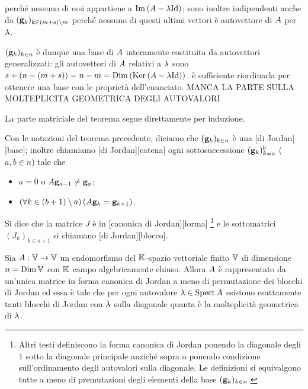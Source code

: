 perch\'e nessuno di essi appartiene a 
$\Image{(\LinearTransformation - \Eigenvalue\Identity)}$;
sono inoltre indipendenti anche da
$(\GeneralizedEigenvector_k)_{k \in (m + s) \SetMin m}$
perch\'e nessuno di questi ultimi vettori \`e autovettore di
$A$ per $\lambda$.
\par $(\GeneralizedEigenvector_k)_{k \in n}$ \`e dunque una base di
$A$ interamente costituita da autovettori generalizzati:
gli autovettori di $A$ relativi a $\lambda$ sono
$s + (n - (m + s)) = n - m =
\LinearDimension{(\Kernel{(\LinearTransformation - \Eigenvalue\Identity)})}$.
\`e sufficiente riordinarla per ottenere una base con le propriet\`a
dell'enunciato.
MANCA LA PARTE SULLA MOLTEPLICITA GEOMETRICA DEGLI AUTOVALORI
\par La parte matriciale del teorema segue direttamente per induzione.
\begin{Definition}
  Con le notazioni del teorema precedente, diciamo che
  $(\GeneralizedEigenvector_k)_{k \in n}$ \`e una
  [di Jordan][base]; inoltre chiamiamo
  [di Jordan][catena]
  ogni sottosuccessione
  $(\GeneralizedEigenvector_k)_{k = a}^b$ ($a, b \in n$) tale che
  \begin{itemize}
    \item $a = 0$ o
      $\LinearTransformation \GeneralizedEigenvector_{a - 1}
        \neq \GeneralizedEigenvector_a$;
    \item $\ForAll{k \in (b + 1) \SetMin a}
      {\LinearTransformation \GeneralizedEigenvector_k
        = \GeneralizedEigenvector_{k + 1}}$.
  \end{itemize}
  \par Si dice che la matrice $J$
  \`e in
  [canonica di Jordan][forma]
  \footnote{Altri testi definiscono la forma canonica di Jordan ponendo la
  diagonale degli $1$ sotto la diagonale principale anzich\'e sopra o
  ponendo condizione sull'ordinamento degli autovalori sulla diagonale. Le
  definizioni si equivalgono tutte a meno di premutazioni degli elementi
  della base $(\GeneralizedEigenvector_k)_{k \in n}$.} e le sottomatrici
  $(J_k)_{k \in s + 1}$ si chiamano
  [di Jordan][blocco].
\end{Definition}
\begin{Theorem}
	Sia $A: \mathbb{V} \rightarrow \mathbb{V}$ un
  endomorfismo del $\mathbb{K}$-spazio vettoriale finito $\mathbb{V}$ di
  dimensione $n = \operatorname{\operatorname{Dim}}{\mathbb{V}}$ con $\mathbb{K}$ campo algebricamente
  chiuso. Allora $A$ \`e rappresentato da un'unica matrice
  in forma canonica di Jordan a meno di permutazione dei blocchi di Jordan ed
  essa \`e tale che per ogni autovalore
  $\lambda \in \operatorname{Spect}{A}$ esistono esattamente
  tanti blocchi di Jordan con $\lambda$ sulla diagonale quanta \`e la
  molteplicit\`a geometrica di $\lambda$.
\end{Theorem}
